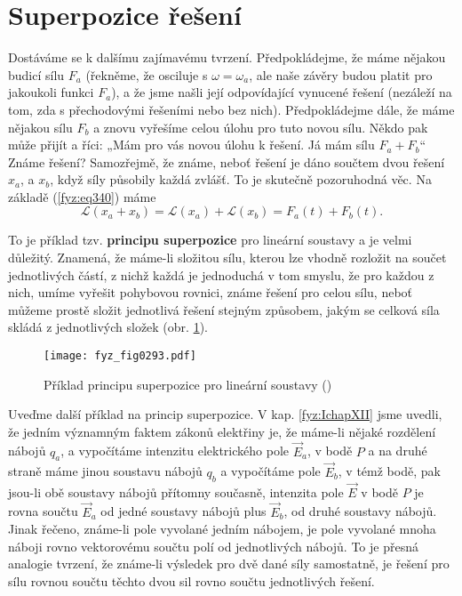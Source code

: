   \section{Superpozice řešení}\label{fyz:IchapXXVsecII}
    Dostáváme se k dalšímu zajímavému tvrzení. Předpokládejme, že máme nějakou budicí sílu \(F_a\) 
    (řekněme, že osciluje s \(\omega = \omega_a\), ale naše závěry budou platit pro jakoukoli 
    funkci \(F_a\)), a že jsme našli její odpovídající vynucené řešení (nezáleží na tom, zda s 
    přechodovými řešeními nebo bez nich). Předpokládejme dále, že máme nějakou sílu \(F_b\) a znovu 
    vyřešíme celou úlohu pro tuto novou sílu. Někdo pak může přijít a říci: „Mám pro vás novou 
    úlohu k řešení. Já mám sílu \(F_a + F_b\)“ Známe řešení? Samozřejmě, že známe, neboť řešení je 
    dáno součtem dvou řešení \(x_a\), a \(x_b\), když síly působily každá zvlášť. To je skutečně 
    pozoruhodná věc. Na základě (\ref{fyz:eq340}) máme
    \begin{equation}\label{fyz:eq345}
      \mathscr{L}(x_a + x_b) = \mathscr{L}(x_a) + \mathscr{L}(x_b) = F_a(t) + F_b(t).
    \end{equation}
    
    To je příklad tzv.\textbf{ principu superpozice} pro lineární soustavy a je velmi důležitý. 
    Znamená, že máme-li složitou sílu, kterou lze vhodně rozložit na součet jednotlivých částí, z 
    nichž každá je jednoduchá v tom smyslu, že pro každou z nich, umíme vyřešit pohybovou rovnici, 
    známe řešení pro celou sílu, neboť můžeme prostě složit jednotlivá řešení stejným způsobem, 
    jakým se celková síla skládá z jednotlivých složek (obr. \ref{fyz:fig0293}).

    \begin{figure}[ht!] %
      \centering
      \texttt{[image: fyz\_fig0293.pdf]}
      \caption{Příklad principu superpozice pro lineární soustavy
               (\cite[s.~334]{Feynman01})}
      \label{fyz:fig0293}
    \end{figure}
    
    Uveďme další příklad na princip superpozice. V kap. \ref{fyz:IchapXII} jsme uvedli, že jedním 
    významným faktem zákonů elektřiny je, že máme-li nějaké rozdělení nábojů \(q_a\), a vypočítáme 
    intenzitu elektrického pole \(\vec{E}_a\), v bodě \(P\) a na druhé straně máme jinou soustavu 
    nábojů \(q_b\) a vypočítáme pole \(\vec{E}_b\), v témž bodě, pak jsou-li obě soustavy nábojů 
    přítomny současně, intenzita pole \(\vec{E}\) v bodě \(P\) je rovna součtu \(\vec{E}_a\) od 
    jedné soustavy nábojů plus \(\vec{E}_b\), od druhé soustavy nábojů. Jinak řečeno, známe-li pole 
    vyvolané jedním nábojem, je pole vyvolané mnoha náboji rovno vektorovému součtu polí od 
    jednotlivých nábojů. To je přesná analogie tvrzení, že známe-li výsledek pro dvě dané síly 
    samostatně, je řešení pro sílu rovnou součtu těchto dvou sil rovno součtu jednotlivých řešení.
    
